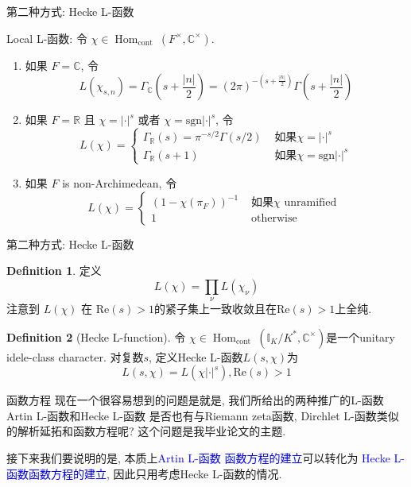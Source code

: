 \documentclass[aspectratio=169]{beamer}
\theoremstyle{definition}
\newtheorem{defn}{Definition}[section]
\newcommand{\blue}[1]{\textcolor{blue}{#1}}
\newenvironment{enu}{\begin{enumerate}[(1)]}{\end{enumerate}}
\begin{document}
\begin{frame}{第二种方式: Hecke L-函数}

    Local L-函数: 令 $\chi \in \operatorname{Hom}_{\text {cont }}\left(F^{\times}, \mathbb{C}^{\times}\right)$.
    \begin{enu} 
        \item 如果 $F=\mathbb{C}$, 令
        $$
        L\left(\chi_{s, n}\right)=\Gamma_{\mathbb{C}}\left(s+\frac{|n|}{2}\right)=(2 \pi)^{-\left(s+\frac{|n|}{2}\right)} \Gamma\left(s+\frac{|n|}{2}\right)
        $$
        \item 如果 $F=\mathbb{R}$ 且 $\chi=|\cdot|^s$ 或者 $\chi=\text{sgn}|\cdot|^s$, 令
        $$
        L(\chi)= \begin{cases}\Gamma_{\mathbb{R}}(s)=\pi^{-s / 2} \Gamma(s / 2) & \text { 如果} \chi=|\cdot|^s \\ \Gamma_{\mathbb{R}}(s+1) & \text { 如果} \chi=\text{sgn}|\cdot|^s\end{cases}
        $$
        \item 如果 $F$ is non-Archimedean, 令
        $$
        L(\chi)= \begin{cases}\left(1-\chi\left(\pi_F\right)\right)^{-1} & \text { 如果} \chi \text { unramified } \\ 1 & \text { otherwise }\end{cases}
        $$
    \end{enu}
   

\end{frame}
\begin{frame}{第二种方式: Hecke L-函数}
    \begin{defn}
        定义
        $$
        L(\chi)=\prod_\nu L\left(\chi_\nu\right)
        $$
        注意到 $L(\chi)$ 在 $\text{Re}(s)>1$的紧子集上一致收敛且在$\text{Re}(s)>1$上全纯.
    \end{defn}
    \begin{defn}[Hecke L-function]
        令 $\chi \in \operatorname{Hom}_{\text {cont }}\left(\mathbb{I}_K / K^*, \mathbb{C}^{\times}\right)$是一个unitary idele-class character. 
        对复数$s$, 定义Hecke L-函数$L(s, \chi)$为
        $$
        L(s, \chi)=L\left(\chi|\cdot|^s\right), \text{Re}(s)>1
        $$
    \end{defn}
\end{frame}


\begin{frame}{函数方程}
    现在一个很容易想到的问题是就是, 我们所给出的两种推广的L-函数
    Artin L-函数和Hecke L-函数
    是否也有与Riemann zeta函数, Dirchlet L-函数类似的解析延拓和函数方程呢? 
    这个问题是我毕业论文的主题.  

    接下来我们要说明的是, 本质上\blue{Artin L-函数 函数方程的建立}可以转化为
    \blue{Hecke L-函数函数方程的建立}, 因此只用考虑Hecke 
    L-函数的情况. 
\end{frame}
\end{document}
